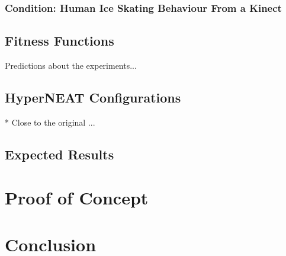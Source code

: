 \documentclass[a4paper,10pt]{article}
\begin{document}
\subsubsection{Condition: Human Ice Skating Behaviour From a Kinect}


\subsection{Fitness Functions}


Predictions about the experiments...


\subsection{HyperNEAT Configurations}
* Close to the original ...

\subsection{Expected Results}



\section{Proof of Concept}
\label{sec:proof-of-concept}


\section{Conclusion}
\label{sec:conclusion}




\end{document}
